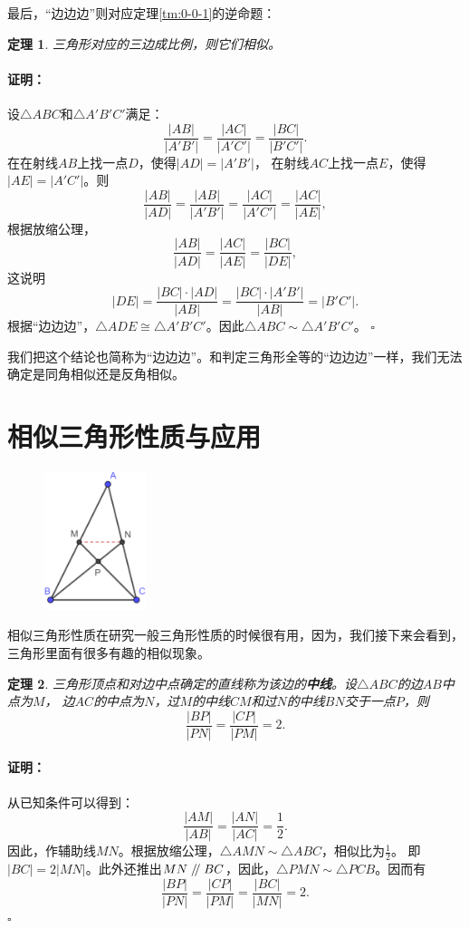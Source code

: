 \documentclass[12pt,UTF8]{ctexbook}
\newtheorem{tm}{定理}[section]
\newenvironment{proof2}{\paragraph{\textbf{证明：}}}{\hfill$\square$}
\renewcommand\parallel{\mathrel{/\mskip-4mu/}}
\begin{document}
最后，“边边边”则对应定理\ref{tm:0-0-1}的逆命题：
\begin{tm}\label{tm:0-1-1}
    三角形对应的三边成比例，则它们相似。
\end{tm}
\begin{proof2}
    设$\triangle ABC$和$\triangle A'B'C'$满足：
    $$ \frac{|AB|}{|A'B'|} = \frac{|AC|}{|A'C'|} = \frac{|BC|}{|B'C'|}.$$
    在在射线$AB$上找一点$D$，使得$|AD| = |A'B'|$，
    在射线$AC$上找一点$E$，使得$|AE| = |A'C'|$。则
    $$ \frac{|AB|}{|AD|} = \frac{|AB|}{|A'B'|} = \frac{|AC|}{|A'C'|} = \frac{|AC|}{|AE|},$$
    根据放缩公理，
    $$ \frac{|AB|}{|AD|} = \frac{|AC|}{|AE|} = \frac{|BC|}{|DE|},$$
    这说明
    $$ |DE| = \frac{|BC|\cdot |AD|}{|AB|} = \frac{|BC|\cdot |A'B'|}{|AB|} = |B'C'|. $$
    根据“边边边”，$\triangle ADE \cong \triangle A'B'C'$。因此$\triangle ABC \sim \triangle A'B'C'$。
\end{proof2}

我们把这个结论也简称为“边边边”。和判定三角形全等的“边边边”一样，我们无法确定是同角相似还是反角相似。

\section{相似三角形性质与应用}

\begin{figure} %
    \vspace{-10pt}
    \includegraphics[width=0.27\textwidth]{三角形8.png}
\end{figure}

相似三角形性质在研究一般三角形性质的时候很有用，因为，我们接下来会看到，三角形里面有很多有趣的相似现象。

\begin{tm}\label{tm:0-2-0}
    三角形顶点和对边中点确定的直线称为该边的\textbf{中线}。设$\triangle ABC$的边$AB$中点为$M$，
    边$AC$的中点为$N$，过$M$的中线$CM$和过$N$的中线$BN$交于一点$P$，则
    $$\frac{|BP|}{|PN|} = \frac{|CP|}{|PM|} = 2.$$
\end{tm}
\begin{proof2}
    从已知条件可以得到：
    $$\frac{|AM|}{|AB|} = \frac{|AN|}{|AC|} = \frac12.$$
    因此，作辅助线$MN$。根据放缩公理，$\triangle AMN \sim \triangle ABC$，相似比为$\frac12$。
    即$|BC| = 2|MN|$。此外还推出$MN \parallel BC$，因此，$\triangle PMN \sim \triangle PCB$。因而有
    $$\frac{|BP|}{|PN|} = \frac{|CP|}{|PM|} = \frac{|BC|}{|MN|} = 2.$$
\end{proof2}
\end{document}
